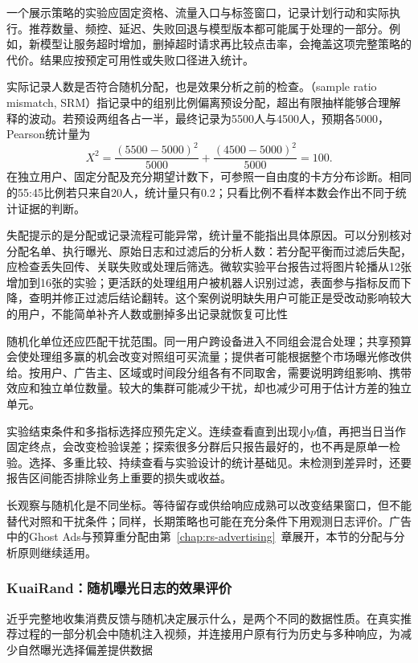 一个展示策略的实验应固定资格、流量入口与标签窗口，记录计划行动和实际执行。推荐数量、频控、延迟、失败回退与模型版本都可能属于处理的一部分。例如，新模型让服务超时增加，删掉超时请求再比较点击率，会掩盖这项完整策略的代价。结果应按预定可用性或失败口径进入统计。

实际记录人数是否符合随机分配，也是效果分析之前的检查。（sample ratio mismatch, SRM）指记录中的组别比例偏离预设分配，超出有限抽样能够合理解释的波动。若预设两组各占一半，最终记录为5500人与4500人，预期各5000，Pearson统计量为
\[
 X^2=\frac{(5500-5000)^2}{5000}
       +\frac{(4500-5000)^2}{5000}=100.
\]
在独立用户、固定分配及充分期望计数下，可参照一自由度的卡方分布诊断。相同的55:45比例若只来自20人，统计量只有0.2；只看比例不看样本数会作出不同于统计证据的判断。

失配提示的是分配或记录流程可能异常，统计量不能指出具体原因。可以分别核对分配名单、执行曝光、原始日志和过滤后的分析人数：若分配平衡而过滤后失配，应检查丢失回传、关联失败或处理后筛选。微软实验平台报告过将图片轮播从12张增加到16张的实验；更活跃的处理组用户被机器人识别过滤，表面参与指标反而下降，查明并修正过滤后结论翻转。这个案例说明缺失用户可能正是受改动影响较大的用户，不能简单补齐人数或删掉多出记录就恢复可比性

随机化单位还应匹配干扰范围。同一用户跨设备进入不同组会混合处理；共享预算会使处理组多赢的机会改变对照组可买流量；提供者可能根据整个市场曝光修改供给。按用户、广告主、区域或时间段分组各有不同取舍，需要说明跨组影响、携带效应和独立单位数量。较大的集群可能减少干扰，却也减少可用于估计方差的独立单元。

实验结束条件和多指标选择应预先定义。连续查看直到出现小$p$值，再把当日当作固定终点，会改变检验误差；探索很多分群后只报告最好的，也不再是原单一检验。选择、多重比较、持续查看与实验设计的统计基础见。未检测到差异时，还要报告区间能否排除业务上重要的损失或收益。

长观察与随机化是不同坐标。等待留存或供给响应成熟可以改变结果窗口，但不能替代对照和干扰条件；同样，长期策略也可能在充分条件下用观测日志评价。广告中的Ghost Ads与预算重分配由第~\ref{chap:rs-advertising}~章展开，本节的分配与分析原则继续适用。

\Needspace{105mm}
\subsubsection{KuaiRand：随机曝光日志的效果评价}
\label{sec:rs-evaluation-kuairand}

近乎完整地收集消费反馈与随机决定展示什么，是两个不同的数据性质。在真实推荐过程的一部分机会中随机注入视频，并连接用户原有行为历史与多种响应，为减少自然曝光选择偏差提供数据

